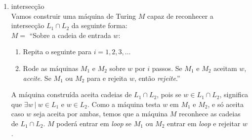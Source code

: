\begin{enumerate}[label={\textbf{\alph*.}}]
    \item intersecção\\[3pt]
    Vamos construir uma máquina de Turing $M$ capaz de reconhecer a intersecção $L_1 \cap L_2$ da seguinte forma:\\[3pt]
    $M =$ “Sobre a cadeia de entrada $w$:
    \begin{enumerate}[label={\textbf{\arabic*.}}, leftmargin=1in]
        \item Repita o seguinte para $i = 1, 2, 3, \ldots$
    
        \item Rode as máquinas $M_1$ e $M_2$ sobre $w$ por $i$ passos. Se $M_1$ e $M_2$ aceitam $w$, \textit{aceite}. Se $M_1$ ou $M_2$ para e rejeita $w$, então \textit{rejeite}.”
    \end{enumerate}
    
    A máquina construída aceita cadeias de $L_1 \cap L_2$, pois se $w \in L_1 \cap L_2$, significa que $\exists w \ |\ w \in L_1$ e $w \in L_2$. Como a máquina testa $w$ em $M_1$ e $M_2$, e só aceita caso $w$ seja aceita por ambas, temos que a máquina $M$ reconhece as cadeias de $L_1 \cap L_2$. $M$ poderá entrar em \textit{loop} se $M_1$ ou $M_2$ entrar em \textit{loop} e rejeitar $w$.
\end{enumerate}